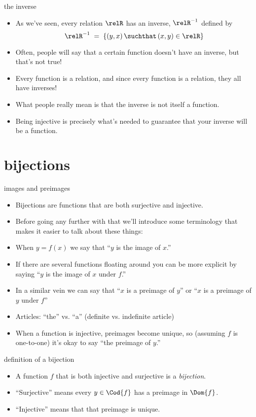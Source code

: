 \documentclass[handout,landscape]{beamer}
\begin{document}
\begin{frame}{the inverse}
\begin{itemize}
\item As we've seen, every relation $\relR$ has an inverse, $\relR^{-1}$ defined by
\[ \relR^{-1} \; = \; \{ (y,x) \, \suchthat \, (x,y) \in \relR \} \]
\pause
\item Often, people will say that a certain function doesn't have an inverse, but that's not true! \pause
\item Every function is a relation, and since every function is a relation, they all have inverses! \pause
\item What people really mean is that the inverse is not itself a function. \pause
\item Being injective is precisely what's needed to guarantee that your inverse will be a function.
\end{itemize}
\end{frame}

\section{bijections}

\begin{frame}{images and preimages}
\begin{itemize}
\item Bijections are functions that are both surjective and injective. \pause
\item Before going any further with that we'll introduce some terminology that makes it easier to talk about these things:\pause
\item When $y = f(x)$ we say that ``$y$ is the image of $x$.'' \pause
\item If there are several functions floating around you can be more explicit by saying \newline
``$y$ is the image of $x$ under $f$.'' \pause
\item In a similar vein we can say that ``$x$ is a preimage of $y$'' or  ``$x$ is a preimage of $y$ under $f$'' 
\item Articles: ``the'' vs. ``a'' \pause (definite vs. indefinite article) \pause
\item When a function is injective, preimages become unique, so (assuming $f$ is one-to-one) it's okay to say ``the preimage of $y$.''
\end{itemize}
\end{frame}

\begin{frame}{definition of a bijection}
\begin{itemize}
\item A function $f$ that is both injective and surjective is a {\em bijection}. \pause
\item ``Surjective'' means every $y \in \Cod{f}$ has a preimage in $\Dom{f}$. \pause
\item ``Injective'' means that that preimage is unique. \pause
\end{itemize}
\end{frame}
\end{document}
